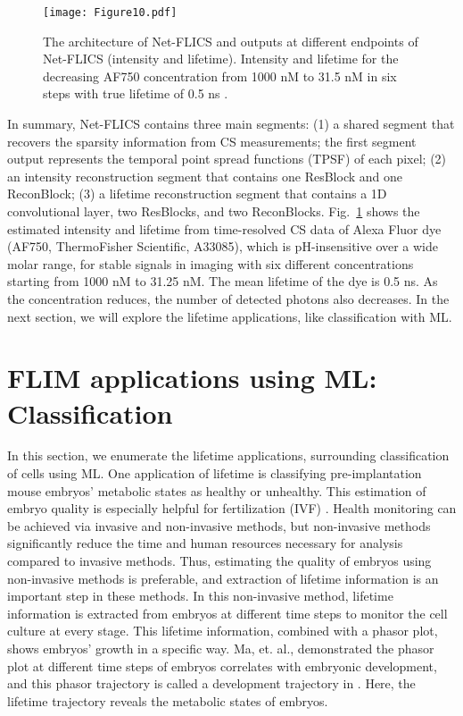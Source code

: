 \documentclass[12pt]{iopart}
\begin{document}
\begin{figure}[!t]
\centering
\texttt{[image: Figure10.pdf]}
\caption{The architecture of Net-FLICS and outputs at different endpoints of Net-FLICS (intensity and lifetime). Intensity and lifetime for the decreasing AF750 concentration from 1000 nM to 31.5 nM in six steps with true lifetime of 0.5 ns \cite{netflics1}.}\label{fig2_netflics1}
\end{figure}

In summary, Net-FLICS contains three main segments: (1) a shared segment that recovers the sparsity information from CS measurements; the first segment output represents the temporal point spread functions (TPSF) of each pixel; (2) an intensity reconstruction segment that contains one ResBlock and one ReconBlock; (3) a lifetime reconstruction segment that contains a 1D convolutional layer, two ResBlocks, and two ReconBlocks. Fig.~\ref{fig2_netflics1} shows the estimated intensity and lifetime from time-resolved CS data of Alexa Fluor dye (AF750, ThermoFisher Scientific, A33085), which is pH-insensitive over a wide molar range, for stable signals in imaging with six different concentrations starting from 1000 nM to 31.25 nM. The mean lifetime of the dye is 0.5 ns. As the concentration reduces, the number of detected photons also decreases. In the next section, we will explore the lifetime applications, like classification with ML.

\section{FLIM applications using ML: Classification} \label{sec2}
In this section, we enumerate the lifetime applications, surrounding classification of cells using ML. One application of lifetime is classifying pre-implantation mouse embryos' metabolic states as healthy or unhealthy. This estimation of embryo quality is especially helpful for  fertilization (IVF) \cite{label}. Health monitoring can be achieved via invasive and non-invasive methods, but non-invasive methods significantly reduce the time and human resources necessary for analysis compared to invasive methods. Thus, estimating the quality of embryos using non-invasive methods is preferable, and extraction of lifetime information is an important step in these methods. In this non-invasive method, lifetime information is extracted from embryos at different time steps to monitor the cell culture at every stage. This lifetime information, combined with a phasor plot, shows embryos' growth in a specific way. Ma, et. al., demonstrated the phasor plot at different time steps of embryos correlates with embryonic development, and this phasor trajectory is called a development trajectory in \cite{label}. Here, the lifetime trajectory reveals the metabolic states of embryos.
\end{document}

